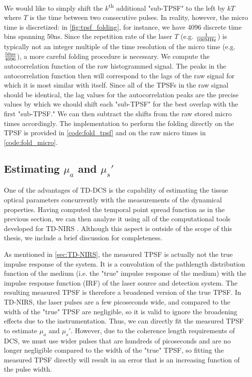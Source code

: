 We would like to simply shift the $k$\textsuperscript{th} additional "sub-TPSF" to the left by $kT$ where $T$ is the time between two consecutive pulses. In reality, however, the micro time is discretized: in \autoref{fig:tpsf_folding}, for instance, we have 4096 discrete time bins spanning 50ns. Since the repetition rate of the laser $T$ (e.g. $\frac{1}{100\textnormal{MHz}}$) is typically not an integer multiple of the time resolution of the micro time (e.g. $\frac{50\textnormal{ns}}{4096}$), a more careful folding procedure is necessary. We compute the autocorrelation function of the raw histogrammed signal. The peaks in the autocorrelation function then will correspond to the lags of the raw signal for which it is most similar with itself. Since all of the TPSFs in the raw signal should be identical, the lag values for the autocorrelation peaks are the precise values by which we should shift each "sub-TPSF" for the best overlap with the first "sub-TPSF." We can then subtract the shifts from the raw stored micro times accordingly. The implementation to perform the folding directly on the TPSF is provided in \autoref{code:fold_tpsf} and on the raw micro times in \autoref{code:fold_micro}.


\subsection{Estimating $\mu_a$ and $\mu_s'$} \label{sec:est_opt_params}
One of the advantages of TD-DCS is the capability of estimating the tissue optical parameters concurrently with the measurements of the dynamical properties. Having computed the temporal point spread function as in the previous section, we can then analyze it using all of the computational tools developed for TD-NIRS \cite{Torricelli2014}. Although this aspect is outside of the scope of this thesis, we include a brief discussion for completeness. 

As mentioned in \autoref{sec:TD-NIRS}, the measured TPSF is actually not the true impulse response of the system. It is a convolution of the pathlength distribution function of the medium (i.e. the "true" impulse response of the medium) with the impulse response function (IRF) of the laser source and detection system. The resulting measured TPSF is therefore a broadened version of the true TPSF. In TD-NIRS, the laser pulses are a few picoseconds wide, and compared to the width of the "true" TPSF are negligible, so it is valid to ignore the broadening effects due to the instrumentation. Thus, we can directly fit the measured TPSF to estimate $\mu_a$ and $\mu_s'$. However, due to the coherence length requirements of DCS, we must use wider pulses that are hundreds of picoseconds and are no longer negligible compared to the width of the "true" TPSF, so fitting the measured TPSF directly will result in an error that is an increasing function of the pulse width. 

